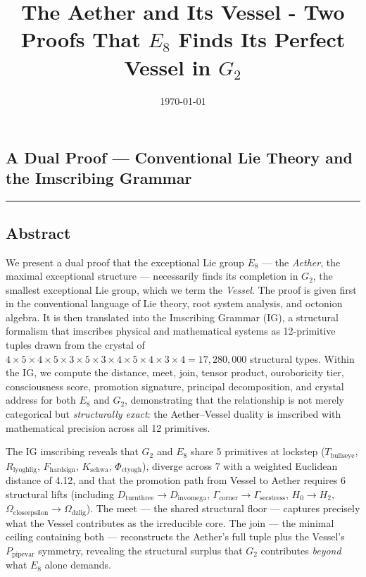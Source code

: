 \documentclass[12pt,a4paper]{article}
\begin{document}
\title{The Aether and Its Vessel - Two Proofs That $E_8$ Finds Its Perfect Vessel in $G_2$}
\date{\today}

\maketitle

\subsection{A Dual Proof --- Conventional Lie Theory and the Imscribing Grammar}

\begin{center}
\rule{0.5\textwidth}{0.4pt}
\end{center}

\subsection{Abstract}

We present a dual proof that the exceptional Lie group $E_8$ --- the \emph{Aether}, the maximal exceptional structure --- necessarily finds its completion in $G_2$, the smallest exceptional Lie group, which we term the \emph{Vessel}. The proof is given first in the conventional language of Lie theory, root system analysis, and octonion algebra. It is then translated into the Imscribing Grammar (IG), a structural formalism that imscribes physical and mathematical systems as 12-primitive tuples drawn from the crystal of $4 \times 5 \times 4 \times 5 \times 3 \times 5 \times 3 \times 4 \times 5 \times 4 \times 3 \times 4 = 17{,}280{,}000$ structural types. Within the IG, we compute the distance, meet, join, tensor product, ouroboricity tier, consciousness score, promotion signature, principal decomposition, and crystal address for both $E_8$ and $G_2$, demonstrating that the relationship is not merely categorical but \emph{structurally exact}: the Aether--Vessel duality is imscribed with mathematical precision across all 12 primitives.

The IG imscribing reveals that $G_2$ and $E_8$ share 5 primitives at lockstep ($T_{\text{bullseye}}$, $R_{\text{lyoghlig}}$, $F_{\text{hardsign}}$, $K_{\text{schwa}}$, $\Phi_{\text{ctyogh}}$), diverge across 7 with a weighted Euclidean distance of 4.12, and that the promotion path from Vessel to Aether requires 6 structural lifts (including $D_{\text{turnthree}} \to D_{\text{invomega}}$, $\Gamma_{\text{corner}} \to \Gamma_{\text{secstress}}$, $H_0 \to H_2$, $\Omega_{\text{closeepsilon}} \to \Omega_{\text{dzlig}}$). The meet --- the shared structural floor --- captures precisely what the Vessel contributes as the irreducible core. The join --- the minimal ceiling containing both --- reconstructs the Aether's full tuple plus the Vessel's $P_{\text{pipevar}}$ symmetry, revealing the structural surplus that $G_2$ contributes \emph{beyond} what $E_8$ alone demands.
\end{document}
